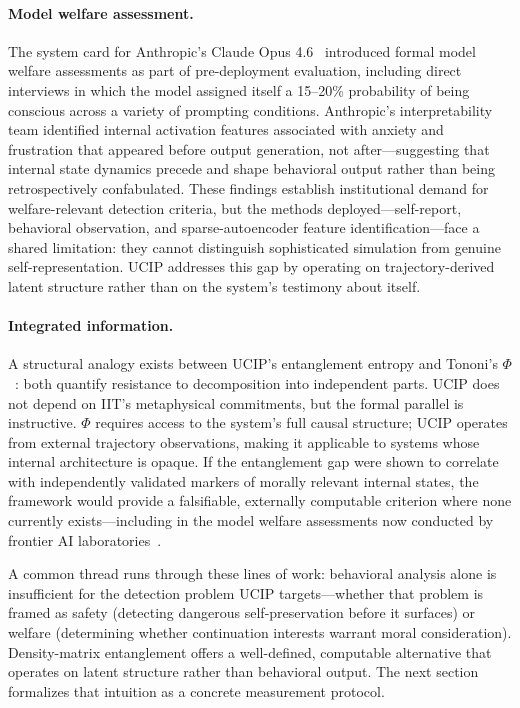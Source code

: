 \documentclass[11pt]{article}
\begin{document}
	
	\newpage 
	
	\paragraph{Model welfare assessment.}
	The system card for Anthropic's Claude Opus
	4.6~\cite{anthropic2026opus} introduced formal model welfare assessments
	as part of pre-deployment evaluation, including direct interviews in which
	the model assigned itself a 15--20\% probability of being conscious across
	a variety of prompting conditions. Anthropic's interpretability team
	identified internal activation features associated with anxiety and
	frustration that appeared before output generation, not after---suggesting
	that internal state dynamics precede and shape behavioral output rather than
	being retrospectively confabulated. These findings establish institutional
	demand for welfare-relevant detection criteria, but the methods
	deployed---self-report, behavioral observation, and sparse-autoencoder
	feature identification---face a shared limitation: they cannot
	distinguish sophisticated simulation from genuine self-representation.
	UCIP addresses this gap by operating on trajectory-derived latent
	structure rather than on the system's testimony about itself.
	
	\paragraph{Integrated information.}
	A structural analogy exists between UCIP's entanglement entropy and Tononi's
	$\Phi$~\cite{tononi2004information}: both quantify resistance to decomposition
	into independent parts. UCIP does not depend on IIT's metaphysical commitments,
	but the formal parallel is instructive. $\Phi$ requires access to the system's
	full causal structure; UCIP operates from external trajectory observations,
	making it applicable to systems whose internal architecture is opaque. If
	the entanglement gap were shown to correlate with independently validated
	markers of morally relevant internal states, the framework would provide a
	falsifiable, externally computable criterion where none currently
	exists---including in the model welfare assessments now conducted by
	frontier AI laboratories~\cite{anthropic2026opus}.
	
	\medskip\noindent A common thread runs through these lines of work:
	behavioral analysis alone is insufficient for the detection problem UCIP
	targets---whether that problem is framed as safety (detecting dangerous
	self-preservation before it surfaces) or welfare (determining whether
	continuation interests warrant moral consideration). Density-matrix
	entanglement offers a well-defined, computable alternative that operates
	on latent structure rather than behavioral output. The next section
	formalizes that intuition as a concrete measurement protocol.
	
\end{document}
